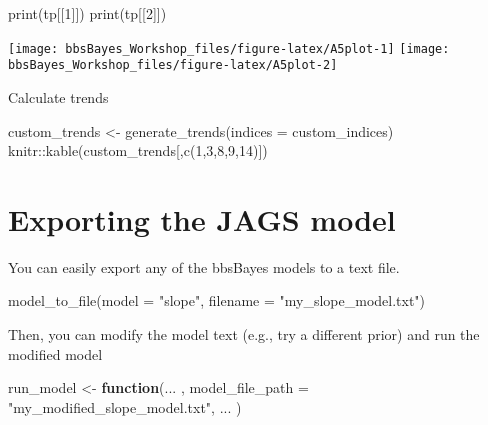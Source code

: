 \documentclass[
]{book}
\newenvironment{Shaded}{\begin{snugshade}}{\end{snugshade}}
\newcommand{\AttributeTok}[1]{\textcolor[rgb]{0.77,0.63,0.00}{#1}}
\newcommand{\ControlFlowTok}[1]{\textcolor[rgb]{0.13,0.29,0.53}{\textbf{#1}}}
\newcommand{\DecValTok}[1]{\textcolor[rgb]{0.00,0.00,0.81}{#1}}
\newcommand{\FunctionTok}[1]{\textcolor[rgb]{0.00,0.00,0.00}{#1}}
\newcommand{\NormalTok}[1]{#1}
\newcommand{\OtherTok}[1]{\textcolor[rgb]{0.56,0.35,0.01}{#1}}
\newcommand{\SpecialCharTok}[1]{\textcolor[rgb]{0.00,0.00,0.00}{#1}}
\newcommand{\StringTok}[1]{\textcolor[rgb]{0.31,0.60,0.02}{#1}}
\begin{document}
\begin{Shaded}
\begin{Highlighting}[]
\FunctionTok{print}\NormalTok{(tp[[}\DecValTok{1}\NormalTok{]])}
\FunctionTok{print}\NormalTok{(tp[[}\DecValTok{2}\NormalTok{]])}
\end{Highlighting}
\end{Shaded}

\begin{center}\texttt{[image: bbsBayes\_Workshop\_files/figure-latex/A5plot-1]} \texttt{[image: bbsBayes\_Workshop\_files/figure-latex/A5plot-2]} \end{center}

Calculate trends

\begin{Shaded}
\begin{Highlighting}[]
\NormalTok{custom\_trends }\OtherTok{\textless{}{-}} \FunctionTok{generate\_trends}\NormalTok{(}\AttributeTok{indices =}\NormalTok{ custom\_indices)}
\NormalTok{knitr}\SpecialCharTok{::}\FunctionTok{kable}\NormalTok{(custom\_trends[,}\FunctionTok{c}\NormalTok{(}\DecValTok{1}\NormalTok{,}\DecValTok{3}\NormalTok{,}\DecValTok{8}\NormalTok{,}\DecValTok{9}\NormalTok{,}\DecValTok{14}\NormalTok{)])}
\end{Highlighting}
\end{Shaded}

\hypertarget{exporting-the-jags-model}{%
\section{Exporting the JAGS model}\label{exporting-the-jags-model}}

You can easily export any of the bbsBayes models to a text file.

\begin{Shaded}
\begin{Highlighting}[]
\FunctionTok{model\_to\_file}\NormalTok{(}\AttributeTok{model =} \StringTok{"slope"}\NormalTok{,}
              \AttributeTok{filename =} \StringTok{"my\_slope\_model.txt"}\NormalTok{)}
\end{Highlighting}
\end{Shaded}

Then, you can modify the model text (e.g., try a different prior) and run the modified model

\begin{Shaded}
\begin{Highlighting}[]
\NormalTok{run\_model }\OtherTok{\textless{}{-}} \ControlFlowTok{function}\NormalTok{(... ,}
                      \AttributeTok{model\_file\_path =} \StringTok{"my\_modified\_slope\_model.txt"}\NormalTok{,}
\NormalTok{                      ... )}
\end{Highlighting}
\end{Shaded}
\end{document}

